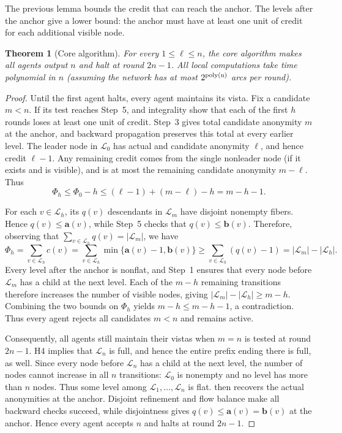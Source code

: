 \documentclass[11pt]{article}
\newcommand{\anon}{\mathbf a}
\newcommand{\cand}{\mathbf b}
\newtheorem{theorem}{Theorem}
\begin{document}
The previous lemma bounds the credit that can reach the anchor.
The levels after the anchor give a lower bound:
the anchor must have at least one unit of credit for each
additional visible node.

\begin{theorem}[Core algorithm]
\label{thm:one-leader}
For every \(1\leq\ell\leq n\), the core algorithm makes all agents output \(n\)
and halt at round \(2n-1\). All local computations take time polynomial in $n$ (assuming the network has at most \(2^{\rm{poly}(n)}\) arcs per round).
\end{theorem}

\begin{proof}
Until the first agent halts, every agent maintains its
vista.
Fix a candidate \(m<n\).  If its test reaches Step~5,
and integrality show that each of the first \(h\) rounds loses at least
one unit of credit. Step~3 gives total candidate
anonymity \(m\) at the anchor, and backward propagation preserves this total
at every earlier level.
The leader node in \(\mathcal L_0\) has actual and candidate anonymity \(\ell\), and hence
credit \(\ell-1\).  Any remaining credit comes from
the single nonleader node (if it exists and is visible), and is at most the remaining
candidate anonymity \(m-\ell\). Thus
\[
 \Phi_h\leq \Phi_0-h\leq (\ell-1)+(m-\ell)-h = m-h-1.
\]

For each \(v\in\mathcal L_h\), its \(q(v)\) descendants in
\(\mathcal L_m\) have disjoint nonempty fibers.  Hence \(q(v)\leq\anon(v)\), while Step~5 checks that \(q(v)\leq\cand(v)\).  Therefore, observing that $\sum_{v\in\mathcal L_h}q(v)=|\mathcal L_m|$, we have
\[
 \Phi_h = \sum_{v\in\mathcal L_h}c(v)=
 \sum_{v\in\mathcal L_h} \min\{\anon(v)-1,\cand(v)\}
 \geq \sum_{v\in\mathcal L_h}(q(v)-1) 
     =|\mathcal L_m|-|\mathcal L_h|.
\]
Every level after the anchor is nonflat, and Step~1 ensures that
every node before \(\mathcal L_m\) has a child at the next level.
Each of the \(m-h\) remaining transitions therefore increases
the number of visible nodes, giving
\(|\mathcal L_m|-|\mathcal L_h|\geq m-h\).
Combining the two bounds on \(\Phi_h\) yields
\(m-h\leq m-h-1\), a contradiction.
Thus every agent rejects all candidates \(m<n\) and remains active.

Consequently, all agents still maintain their vistas
when \(m=n\) is tested at round \(2n-1\). H4 implies that
\(\mathcal L_n\) is full, and hence the entire prefix ending there is full, as well.  Since
every node before \(\mathcal L_n\) has a child at the next level, the number of nodes cannot increase in all \(n\)
transitions: \(\mathcal L_0\) is nonempty and no level has more than \(n\) nodes.
Thus some level among \(\mathcal L_1,\ldots,\mathcal L_n\) is flat.
 then recovers the actual anonymities at the
anchor.  Disjoint refinement and flow balance make all backward checks
succeed, while disjointness gives
\(q(v)\leq\anon(v)=\cand(v)\) at the anchor.
Hence every agent accepts \(n\) and halts at round \(2n-1\).


\end{proof}
\end{document}
